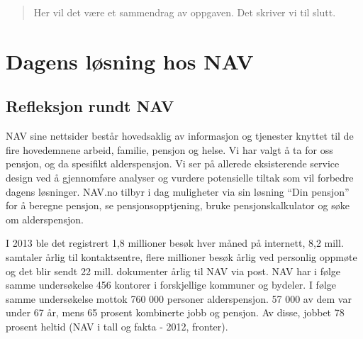 \documentclass[informationsecurity]{gucmasterproject}
\begin{document}
\thesisdate{\gucmasterthesisdate}
\makefrontpages %






\begin{abstract}
Her vil det være et sammendrag av oppgaven. Det skriver vi til slutt.

\end{abstract}


\tableofcontents






\chapter{Dagens løsning hos NAV}
\section{Refleksjon rundt NAV}
NAV sine nettsider består hovedsaklig av informasjon og tjenester knyttet til de fire hovedemnene arbeid, familie, pensjon og helse. Vi har valgt å ta for oss pensjon, og da spesifikt alderspensjon. Vi ser på allerede eksisterende service design ved å gjennomføre analyser og vurdere potensielle tiltak som vil forbedre dagens løsninger. NAV.no tilbyr i dag muligheter via sin løsning “Din pensjon” for å beregne pensjon, se pensjonsopptjening, bruke pensjonskalkulator og søke om alderspensjon. 

I 2013 ble det registrert 1,8 millioner besøk hver måned på internett, 8,2 mill. samtaler årlig til kontaktsentre, flere millioner besøk årlig ved personlig oppmøte og det blir sendt 22 mill. dokumenter årlig til NAV via post. NAV har i følge samme undersøkelse 456 kontorer i forskjellige kommuner og bydeler. I følge samme undersøkelse mottok 760 000 personer alderspensjon. 57 000 av dem var under 67 år, mens 65 prosent kombinerte jobb og pensjon. Av disse, jobbet 78 prosent heltid (NAV i tall og fakta - 2012, fronter).
\end{document}
